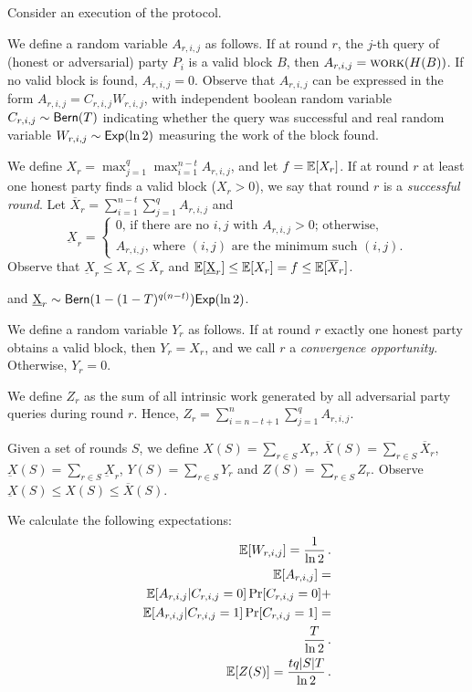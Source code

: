 Consider an execution of the \poem protocol.

We define a random variable $A_{r, i, j}$ as follows.
If at round $r$, the $j$-th query of (honest or adversarial) party $P_i$ is a valid block $B$,
then $A_{r, i, j} = \textsc{work}(H(B))$.
If no valid block is found, $A_{r, i, j} = 0$.
Observe that $A_{r, i, j}$ can be expressed in the form $A_{r, i, j} = C_{r, i, j} W_{r, i, j}$,
with independent boolean random variable $C_{r, i, j} \sim \textsf{Bern}(T)$ indicating whether the query was successful
and real random variable $W_{r, i, j} \sim \textsf{Exp}(\ln2)$ measuring the work of the block found.

We define $X_{r} = \max_{j=1}^q \max_{i = 1}^{n - t} A_{r, i, j}$,
and let $f = \mathop{{}\mathbb{E}}[X_{r}]$.
If at round $r$ at least one honest party finds a valid block ($X_r > 0$),
we say that round $r$ is a \emph{successful round}.
Let $\overline{X}_r = \sum_{i = 1}^{n - t} \sum_{j = 1}^q A_{r,i,j}$ and
\[
  \underbar{X}_r = \begin{cases}
  0 \text{, if there are no $i, j$ with $A_{r,i,j} > 0$; otherwise,}\\
  A_{r,i,j} \text{, where $(i, j)$ are the minimum such $(i, j)$.}
\end{cases}\]
Observe that $\underbar{X}_r \leq X_r \leq \overline{X}_r$
and $\mathop{{}\mathbb{E}}[\underbar{X}_r] \leq \mathop{{}\mathbb{E}}[X_r] = f \leq \mathop{{}\mathbb{E}}[\overline{X}_r]$.

and $\underbar{X}_r \sim \textsf{Bern}(1 - (1 - T)^{q(n - t)}) \textsf{Exp}(\ln 2)$.

We define a random variable $Y_r$ as follows.
If at round $r$ exactly one honest party obtains a valid block, then $Y_r = X_r$,
and we call $r$ a \emph{convergence opportunity}. Otherwise, $Y_r = 0$.

We define $Z_{r}$ as the sum of all intrinsic work generated by all adversarial
party queries during round $r$. Hence, $Z_{r} = \sum_{i = n - t + 1}^n \sum_{j = 1}^q A_{r, i, j}$.

Given a set of rounds $S$, we define
$X(S) = \sum_{r \in S} X_r$,
$\overline{X}(S) = \sum_{r \in S} \overline{X}_r$,
$\underbar{X}(S) = \sum_{r \in S} \underbar{X}_r$,
$Y(S) = \sum_{r \in S} Y_r$
and $Z(S) = \sum_{r \in S} Z_r$.
Observe $\underbar{X}(S) \leq X(S) \leq \overline{X}(S)$.

We calculate the following expectations:
\begin{align*}
  \mathop{{}\mathbb{E}}[W_{r, i, j}] = \frac{1}{\ln2}\,.\\
  \mathop{{}\mathbb{E}}[A_{r, i, j}] =\\
  \mathop{{}\mathbb{E}}[A_{r, i, j} | C_{r, i, j} = 0] \Pr[C_{r, i, j} = 0] +\\
  \mathop{{}\mathbb{E}}[A_{r, i, j} | C_{r, i, j} = 1] \Pr[C_{r, i, j} = 1] =\\
  \frac{T}{\ln2}\,.\\
  \mathop{{}\mathbb{E}}[Z(S)] =
  \frac{tq|S| T}{\ln2}\,.
\end{align*}

